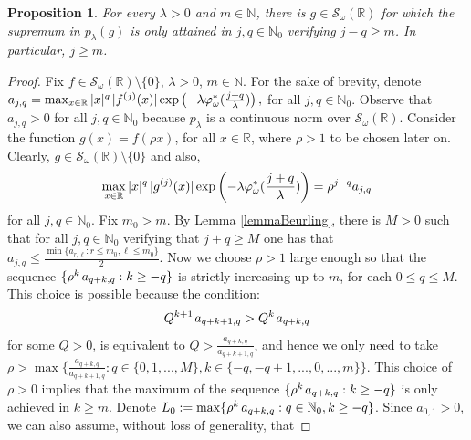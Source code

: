 \documentclass[12pt,reqno]{amsart} %
\newtheorem{prop}[theorem]{Proposition}
\numberwithin{equation}{section}
\begin{document}
				
				\begin{prop}\label{main}
					For every $\lambda>0$ and $m\in\mathbb{N}$, there is $g\in \mathcal{S}_\omega(\mathbb{R})$ for which the supremum in $p_\lambda(g)$ is only attained in $j,q\in\mathbb{N}_0$ verifying $j-q\geq m$. In particular, $j\geq m$. 
				\end{prop}
				\begin{proof}
					Fix $f\in \mathcal{S}_\omega(\mathbb{R})\setminus \{0\}$, $\lambda>0$, $m\in\mathbb{N}$. For the sake of brevity, denote $a_{j,q}=\max_{x\in\mathbb{R}} |x|^q \hspace{0.05cm}|f^{(j)}(x)| \exp\left(-\lambda \varphi_\omega^*(\frac{j+q}{\lambda})\right),$ for all $j, q\in\mathbb{N}_0$. Observe that $a_{j,q}>0$ for all $j,q\in\mathbb{N}_0$ because $p_\lambda$ is a continuous norm over $\mathcal{S}_\omega(\mathbb{R})$. Consider the function $g(x)=f(\rho x)$, for all $x\in\mathbb{R}$, where $\rho> 1$ to be chosen later on. Clearly, $g\in \mathcal{S}_\omega(\mathbb{R})\setminus \{0\}$ and also, \begin{equation}
						\max_{x\in\mathbb{R}} |x|^q \hspace{0.05cm}|g^{(j)}(x)| \exp\left(-\lambda \varphi_\omega^*(\frac{j+q}{\lambda})\right)=\rho^{j-q} a_{j,q}
					\end{equation} for all $j,q\in\mathbb{N}_0$. Fix $m_0>m$. By Lemma \ref{lemmaBeurling}, there is $M>0$ such that for all $j,q\in\mathbb{N}_0$ verifying that $j+q\geq M$ one has that $a_{j,q}\leq \frac{\min\{a_{r,\ell}: r\leq m_0, \ell \leq m_0\}}{2}$. Now we choose $\rho> 1$ large enough so that the sequence $\{\rho^{k}\hspace{0.05cm} a_{q+k,q}: k\geq -q\}$ is strictly increasing up to $m$, for each $0\leq q\leq M$. This choice is possible because the condition: \begin{equation*}
						Q^{k+1}\hspace{0.04cm} a_{q+k+1,q} >Q^k \hspace{0.04cm}a_{q+k,q} 
					\end{equation*} for some $Q>0$, is equivalent to $Q>\frac{a_{q+k,q}}{a_{q+k+1,q}}$, and hence we only need to take $\rho>\max\{\frac{a_{q+k,q}}{a_{q+k+1,q}}: q\in\{0,1,...,M\}, k\in\{-q,-q+1,...,0,...,m\}\}$. This choice of $\rho>0$ implies that the maximum of the sequence $\{\rho^{k} \hspace{0.04cm}a_{q+k,q}: k\geq -q\}$ is only achieved in $k\geq m$. Denote $L_0:=\max\{\rho^{k} \hspace{0.05cm}a_{q+k,q}: q\in\mathbb{N}_0, k\geq -q\}$. Since $a_{0,1}>0$, we can also assume, without loss of generality, that 

\end{proof}
\end{document}

